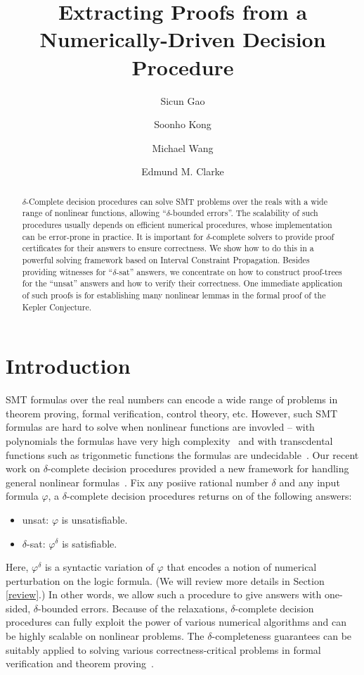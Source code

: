 \documentclass[envcountsect]{llncs}
\title{Extracting Proofs from a Numerically-Driven Decision Procedure}
\author{Sicun Gao \and Soonho Kong \and Michael Wang \and Edmund M. Clarke}
\institute{Carnegie Mellon University, Pittsburgh, PA 15213}
\begin{document}
\maketitle

\begin{abstract}
$\delta$-Complete decision procedures can solve SMT problems over the
reals with a wide range of nonlinear functions, allowing ``$\delta$-bounded
errors''. The scalability of such procedures usually depends on efficient
numerical procedures, whose implementation can be error-prone in practice.
It is important for $\delta$-complete solvers to provide proof certificates 
for their answers to ensure correctness. 
We show how to do this in a powerful solving framework based
on Interval Constraint Propagation. Besides providing witnesses for ``$\delta$-sat''
answers, we concentrate on how to construct proof-trees for the ``unsat''
answers and how to verify their correctness. One immediate application of such proofs 
is for establishing many nonlinear lemmas in the formal proof of the Kepler Conjecture. 
\end{abstract}

\section{Introduction}

SMT formulas over the real numbers can encode a wide range of problems in 
theorem proving, formal verification, control theory, etc. However, such SMT
formulas are hard to solve when nonlinear functions are invovled -- with
polynomials the formulas have very high complexity~\cite{} and with
transcdental functions such as trigonmetic functions the formulas are
undecidable~\cite{}. Our recent work on $\delta$-complete decision procedures
provided a new framework for handling general nonlinear formulas~\cite{}. Fix
any posiive rational number $\delta$ and any input formula $\varphi$, a
$\delta$-complete decision procedures returns on of the following answers:
\begin{itemize}
 \item {\sf unsat}: $\varphi$ is unsatisfiable.
 \item {\sf $\delta$-sat}: $\varphi^{\delta}$ is satisfiable. 
\end{itemize}
Here, $\varphi^{\delta}$ is a syntactic variation of $\varphi$ that encodes a
notion of numerical perturbation on the logic formula. (We will review more 
details in Section \ref{review}.) In other words, we allow such a procedure to
give answers with one-sided, $\delta$-bounded errors. Because of the
relaxations, $\delta$-complete decision procedures can fully exploit the
power of various numerical algorithms and can be highly scalable on
nonlinear problems. The $\delta$-completeness guarantees can be suitably
applied to solving various correctness-critical problems in formal verification
and theorem proving~\cite{}. 
\end{document}
